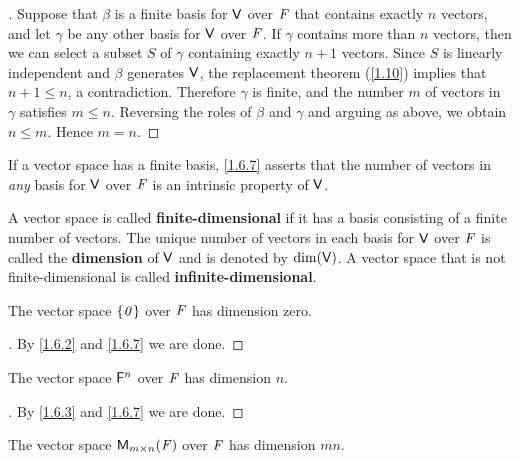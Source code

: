 \begin{proof}[]
	Suppose that \(\beta\) is a finite basis for \(\mathsf{V}\) over \(\mathit{F}\) that contains exactly \(n\) vectors, and let \(\gamma\) be any other basis for \(\mathsf{V}\) over \(\mathit{F}\).
	If \(\gamma\) contains more than \(n\) vectors, then we can select a subset \(S\) of \(\gamma\) containing exactly \(n + 1\) vectors.
	Since \(S\) is linearly independent and \(\beta\) generates \(\mathsf{V}\), the replacement theorem (\cref{1.10}) implies that \(n + 1 \leq n\), a contradiction.
	Therefore \(\gamma\) is finite, and the number \(m\) of vectors in \(\gamma\) satisfies \(m \leq n\).
	Reversing the roles of \(\beta\) and \(\gamma\) and arguing as above, we obtain \(n \leq m\).
	Hence \(m = n\).
\end{proof}

\begin{note}
	If a vector space has a finite basis, \cref{1.6.7} asserts that the number of vectors in \emph{any} basis for \(\mathsf{V}\) over \(\mathit{F}\) is an intrinsic property of \(\mathsf{V}\).
\end{note}

\begin{defn}\label{1.6.8}
	A vector space is called \textbf{finite-dimensional} if it has a basis consisting of a finite number of vectors.
	The unique number of vectors in each basis for \(\mathsf{V}\) over \(\mathit{F}\) is called the \textbf{dimension} of \(\mathsf{V}\) and is denoted by \(\dim(\mathsf{V})\).
	A vector space that is not finite-dimensional is called \textbf{infinite-dimensional}.
\end{defn}

\begin{eg}\label{1.6.9}
	The vector space \(\left\lbrace\mathit{0}\right\rbrace\) over \(\mathit{F}\) has dimension zero.
\end{eg}

\begin{proof}[]
	By \cref{1.6.2} and \cref{1.6.7} we are done.
\end{proof}

\begin{eg}\label{1.6.10}
	The vector space \(\mathsf{F}^n\) over \(\mathit{F}\) has dimension \(n\).
\end{eg}

\begin{proof}[]
	By \cref{1.6.3} and \cref{1.6.7} we are done.
\end{proof}

\begin{eg}\label{1.6.11}
	The vector space \(\ms\) over \(\mathit{F}\) has dimension \(mn\).
\end{eg}

